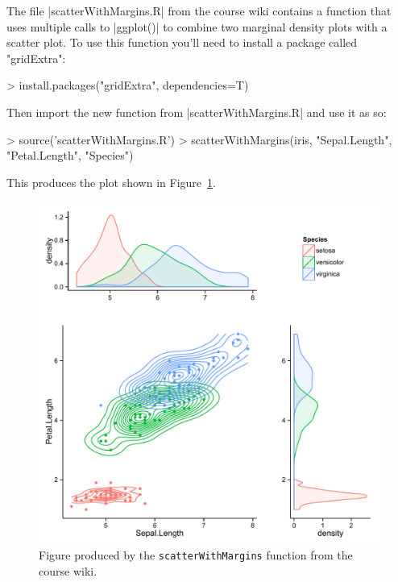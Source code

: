 The file |scatterWithMargins.R| from the course wiki contains a function that uses multiple calls to |ggplot()| to combine two marginal density plots with a scatter plot.  To use this function you'll need to install a package called "gridExtra":
%
\begin{R}
> install.packages("gridExtra", dependencies=T)
\end{R}
Then import the new function from |scatterWithMargins.R| and use it as so:
%
\begin{R}
> source('scatterWithMargins.R')
> scatterWithMargins(iris, "Sepal.Length", "Petal.Length", "Species")
\end{R}
This produces the plot shown in Figure~\ref{fig:ggplotfancy}.
%
\begin{figure}[htbp]
\centering
\includegraphics[width=0.5\columnwidth]{./figures/hands-on2/ggplot-fancy.pdf}
\caption{Figure produced by the \lstinline!scatterWithMargins! function from the course wiki.}
\label{fig:ggplotfancy}
\end{figure}

\newpage